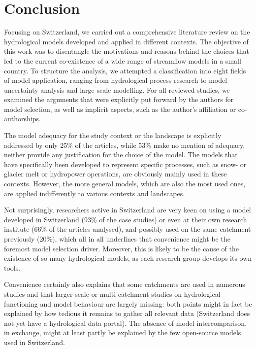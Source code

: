 \documentclass[10pt,a4paper]{article}
\begin{document}
\section{Conclusion}
\label{sec:conclusion}

Focusing on Switzerland, we carried out a comprehensive literature
review on the hydrological models developed and applied in different
contexts. The objective of this work was to disentangle the motivations
and reasons behind the choices that led to the current co-existence of a
wide range of streamflow models in a small country. To structure the
analysis, we attempted a classification into eight fields of model
application, ranging from hydrological process research to model
uncertainty analysis and large scale modelling. For all reviewed
studies, we examined the arguments that were explicitly put forward by
the authors for model selection, as well as implicit aspects, such as
the author's affiliation or co-authorships. 

The model adequacy for the study context or the landscape is explicitly
addressed by only 25\% of the articles, while 53\% make no mention of
adequacy, neither provide any justification for the choice of the model.
The models that have specifically been developed to represent specific
processes, such as snow- or glacier melt or hydropower operations, are
obviously mainly used in these contexts. However, the more general
models, which are also the most used ones, are applied indifferently to
various contexts and landscapes.

Not surprisingly, researchers active in Switzerland are very keen on
using a model developed in Switzerland (93\% of the case studies) or
even at their own research institute (66\% of the articles analysed),
and possibly used on the same catchment previously (20\%), which all in
all underlines that convenience might be the foremost model selection
driver. Moreover, this is likely to be the cause of the existence of so
many hydrological models, as each research group develops its own tools.

Convenience certainly also explains that some catchments are used in
numerous studies and that larger scale or multi-catchment studies on
hydrological functioning and model behaviour are largely missing: both
points might in fact be explained by how tedious it remains to gather
all relevant data (Switzerland does not yet have a hydrological data
portal). The absence of model intercomparison, in exchange, might at
least partly be explained by the few open-source models used in
Switzerland. 
\end{document}
